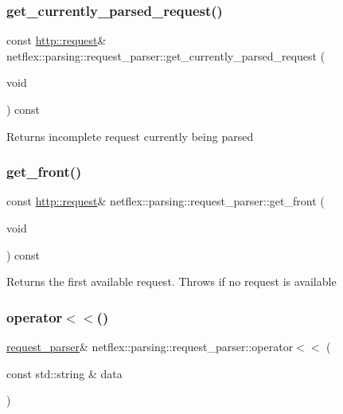 \subsubsection{\texorpdfstring{get\+\_\+currently\+\_\+parsed\+\_\+request()}{get\_currently\_parsed\_request()}}
{\footnotesize\ttfamily const \hyperlink{classnetflex_1_1http_1_1request}{http\+::request}\& netflex\+::parsing\+::request\+\_\+parser\+::get\+\_\+currently\+\_\+parsed\+\_\+request (\begin{DoxyParamCaption}\item[{void}]{ }\end{DoxyParamCaption}) const}

\begin{DoxyReturn}{Returns}
incomplete request currently being parsed 
\end{DoxyReturn}
\mbox{\label{classnetflex_1_1parsing_1_1request__parser_a922495ec5c2ac20be2f8495ec1b06217}} 
\subsubsection{\texorpdfstring{get\+\_\+front()}{get\_front()}}
{\footnotesize\ttfamily const \hyperlink{classnetflex_1_1http_1_1request}{http\+::request}\& netflex\+::parsing\+::request\+\_\+parser\+::get\+\_\+front (\begin{DoxyParamCaption}\item[{void}]{ }\end{DoxyParamCaption}) const}

\begin{DoxyReturn}{Returns}
the first available request. Throws if no request is available 
\end{DoxyReturn}
\mbox{\label{classnetflex_1_1parsing_1_1request__parser_a812651cbfdbff54e025fe131563de818}} 
\subsubsection{\texorpdfstring{operator$<$$<$()}{operator<<()}}
{\footnotesize\ttfamily \hyperlink{classnetflex_1_1parsing_1_1request__parser}{request\+\_\+parser}\& netflex\+::parsing\+::request\+\_\+parser\+::operator$<$$<$ (\begin{DoxyParamCaption}\item[{const std\+::string \&}]{data }\end{DoxyParamCaption})}

